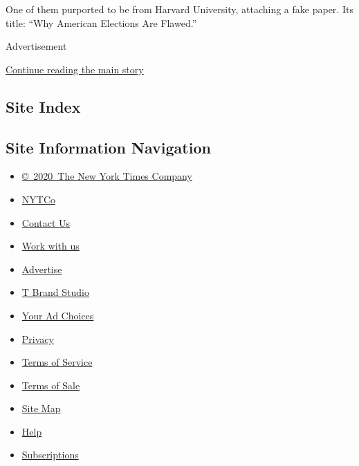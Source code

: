 One of them purported to be from Harvard University, attaching a fake
paper. Its title: ``Why American Elections Are Flawed.''

Advertisement

\protect\hyperlink{after-bottom}{Continue reading the main story}

\hypertarget{site-index}{%
\subsection{Site Index}\label{site-index}}

\hypertarget{site-information-navigation}{%
\subsection{Site Information
Navigation}\label{site-information-navigation}}

\begin{itemize}
\tightlist
\item
  \href{https://help.nytimes3xbfgragh.onion/hc/en-us/articles/115014792127-Copyright-notice}{©~2020~The
  New York Times Company}
\end{itemize}

\begin{itemize}
\tightlist
\item
  \href{https://www.nytco.com/}{NYTCo}
\item
  \href{https://help.nytimes3xbfgragh.onion/hc/en-us/articles/115015385887-Contact-Us}{Contact
  Us}
\item
  \href{https://www.nytco.com/careers/}{Work with us}
\item
  \href{https://nytmediakit.com/}{Advertise}
\item
  \href{http://www.tbrandstudio.com/}{T Brand Studio}
\item
  \href{https://www.nytimes3xbfgragh.onion/privacy/cookie-policy\#how-do-i-manage-trackers}{Your
  Ad Choices}
\item
  \href{https://www.nytimes3xbfgragh.onion/privacy}{Privacy}
\item
  \href{https://help.nytimes3xbfgragh.onion/hc/en-us/articles/115014893428-Terms-of-service}{Terms
  of Service}
\item
  \href{https://help.nytimes3xbfgragh.onion/hc/en-us/articles/115014893968-Terms-of-sale}{Terms
  of Sale}
\item
  \href{https://spiderbites.nytimes3xbfgragh.onion}{Site Map}
\item
  \href{https://help.nytimes3xbfgragh.onion/hc/en-us}{Help}
\item
  \href{https://www.nytimes3xbfgragh.onion/subscription?campaignId=37WXW}{Subscriptions}
\end{itemize}
